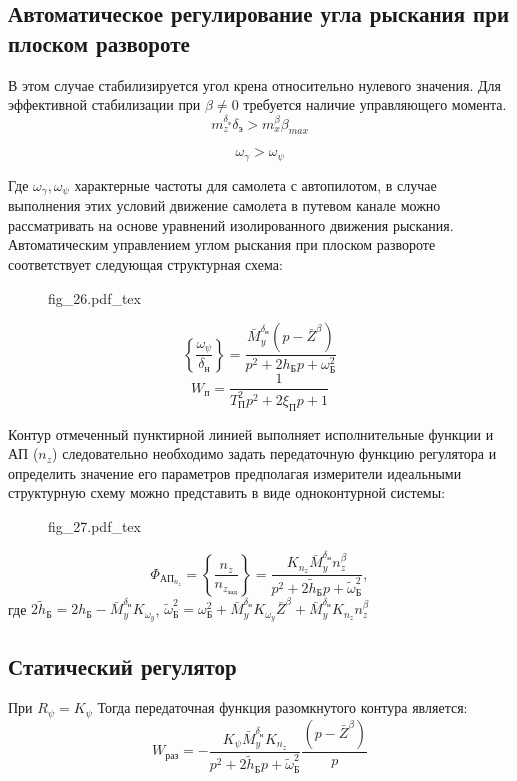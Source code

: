 \documentclass{article}
\begin{document}
\subsection{Автоматическое регулирование угла рыскания при плоском развороте}
В этом случае стабилизируется угол крена относительно нулевого значения. Для
эффективной стабилизации при $\beta \neq 0$ требуется наличие управляющего
момента.
\[
	m_z^{\delta_\text{э}} \delta_\text{э} > m_x^\beta \beta_{max}
\]

\[
	\omega_{\gamma} > \omega_{\psi}
\]

Где $\omega_{\gamma}, \omega_{\psi}$ характерные частоты для самолета с
автопилотом, в случае выполнения этих условий движение самолета в путевом
канале можно рассматривать на основе уравнений изолированного движения
рыскания. Автоматическим управлением углом рыскания при плоском развороте
соответствует следующая структурная схема:

\begin{figure}[H]
	\centering
	{fig_26.pdf_tex}
\end{figure}

\[
	\left\{\frac{\omega_{\psi}}{\delta_\text{н}}\right\}
	=\frac{\bar{M}_y^{\delta_\text{н}}(p - \bar{Z}^\beta)}{p^2 + 2h_\text{Б} p
	+ \omega_\text{Б}^2}
\]
\[
	W_\text{п} = \frac{1}{T_\text{П}^2 p^2 + 2\xi_\text{П} p + 1}
\]

Контур отмеченный пунктирной линией выполняет исполнительные функции и АП
($n_z$) следовательно необходимо задать передаточную функцию регулятора и
определить значение его параметров предполагая измерители идеальными
структурную схему можно представить в виде одноконтурной системы:

\begin{figure}[H]
	\centering
	{fig_27.pdf_tex}
\end{figure}


\[
	\Phi_{\text{АП}_{n_z}} = \left\{\frac{n_z}{n_{z_\text{зад}}} \right\}
	=\frac{K_{n_z}\bar{M}_y^{\delta_\text{н}} n_z^\beta}{p^2 + 2
	\tilde{h}_\text{Б} p + \tilde{\omega}_\text{Б}^2},
\]
где $2\tilde{h}_\text{Б} = 2h_\text{Б} -\bar{M}_y^{\delta_\text{н}}
	K_{{\omega}_y}$, $\tilde{\omega}_\text{Б}^2 = \omega_\text{Б}^2
	+\bar{M}_y^{\delta_\text{н}}K_{\omega_y}\bar{Z}^\beta +
	\bar{M}_y^{\delta_\text{н}} K_{n_z}n_z^\beta$

\subsection{Статический регулятор}
При $R_\psi = K_\psi$
Тогда передаточная функция разомкнутого контура является:
\[
	W_\text{раз} = -\frac{K_{\psi} \bar{M}_y^{\delta_\text{н}} K_{n_z}}{p^2 + 2
	\tilde{h}_\text{Б} p + \tilde{\omega}_\text{Б}^2} \frac{(p -
		\bar{Z}^\beta)}{p}
\]
\end{document}

